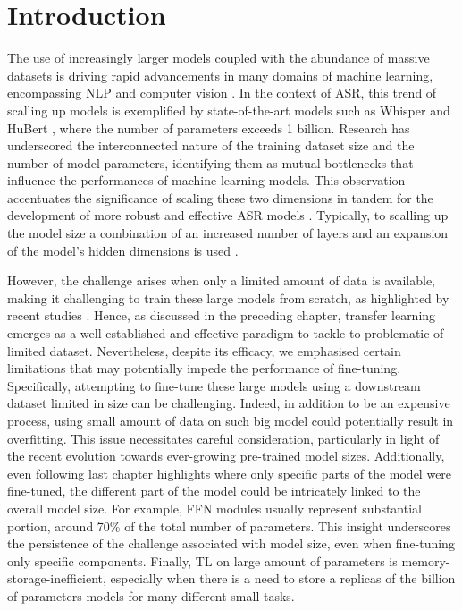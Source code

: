 \label{chap:5}
\cleardoublepage

\section{Introduction}
The use of increasingly larger models coupled with the abundance of massive datasets is driving rapid advancements in many domains of machine learning, encompassing NLP \cite{brown2020language} and computer vision \cite{ramesh2021zero}. In the context of ASR, this trend of scalling up models is exemplified by state-of-the-art models such as Whisper \cite{radford2023robust} and HuBert \cite{hsu2021hubert}, where the number of parameters exceeds 1 billion. Research has underscored the interconnected nature of the training dataset size and the number of model parameters, identifying them as mutual bottlenecks that influence the performances of machine learning models. This observation accentuates the significance of scaling these two dimensions in tandem for the development of more robust and effective ASR models \cite{Kaplan2020ScalingLF}. Typically, to scalling up the model size a combination of an increased number of layers and an expansion of the model's hidden dimensions is used \cite{zheng22d_interspeech}.

However, the challenge arises when only a limited amount of data is available, making it challenging to train these large models from scratch, as highlighted by recent studies \cite{sri_end2end, gelin2021endtoend}. Hence, as discussed in the preceding chapter, transfer learning emerges as a well-established and effective paradigm to tackle to problematic of limited dataset. Nevertheless, despite its efficacy, we emphasised certain limitations that may potentially impede the performance of fine-tuning. Specifically, attempting to fine-tune these large models using a downstream dataset limited in size can be challenging. Indeed, in addition to be an expensive process, using small amount of data on such big model could potentially result in overfitting. This issue necessitates careful consideration, particularly in light of the recent evolution towards ever-growing pre-trained model sizes. Additionally, even following last chapter highlights where only specific parts of the model were fine-tuned, the different part of the model could be intricately linked to the overall model size. For example, FFN modules usually represent substantial portion, around 70\% of the total number of parameters. This insight underscores the persistence of the challenge associated with model size, even when fine-tuning only specific components. Finally, TL on large amount of parameters is memory-storage-inefficient, especially when there is a need to store a replicas of the billion of parameters models for many different small tasks.

